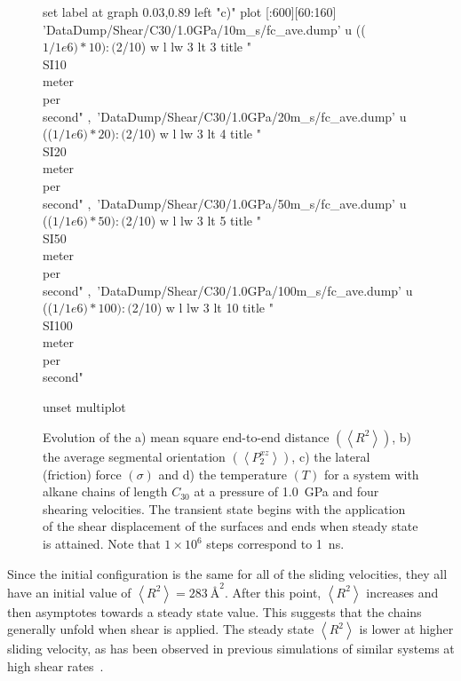 \documentclass[5p]{elsarticle}
\begin{document}
\begin{figure}[htp]
\begin{center}
\begin{gnuplot}[terminal=epslatex, terminaloptions={size \SERFigwidth cm, \SERFigheight cm color solid}]
			set label at graph 0.03,0.89 left "c)"
			plot  [:600][60:160]	'DataDump/Shear/C30/1.0GPa/10m_s/fc_ave.dump' u (($1/1e6)*10):($2/10) w l  lw 3    lt 3    title  "\\SI{10}{\\meter\\per\\second}"   ,\
							'DataDump/Shear/C30/1.0GPa/20m_s/fc_ave.dump' u (($1/1e6)*20):($2/10) w l  lw 3    lt 4    title  "\\SI{20}{\\meter\\per\\second}"   ,\
							'DataDump/Shear/C30/1.0GPa/50m_s/fc_ave.dump' u (($1/1e6)*50):($2/10) w l  lw 3     lt 5    title  "\\SI{50}{\\meter\\per\\second}"  ,\
							'DataDump/Shear/C30/1.0GPa/100m_s/fc_ave.dump' u (($1/1e6)*100):($2/10) w l  lw 3   lt 10    title  "\\SI{100}{\\meter\\per\\second}"  

			unset multiplot
		\end{gnuplot}

		\caption{Evolution of the a) mean square end-to-end distance $\left(\left< R^2 \right>\right)$, b) the average segmental orientation  $\left(\left<P_{2}^{xz}\right>\right)$, c) the lateral (friction) force  $\left(\sigma\right)$ and d) the temperature $\left(T\right)$ for a system with alkane chains of length $C_{30}$ at a pressure of \SI{1.0}{\giga\pascal} and four  shearing velocities. The transient state begins with the application of the shear displacement of the surfaces and ends when  steady state is attained. Note that $1 \times 10^{6}$ steps correspond to \SI{1}{\nano\second}.}
		\label{fig:SS}
	\end{center}
 \end{figure}

Since the initial configuration is the same for all of the sliding velocities, they all have an initial value of $\left< R^2 \right> = \SI{283}{\angstrom\squared}$. After this point, $\left< R^2 \right> $ increases and then asymptotes towards a steady state value. This suggests that the chains generally unfold when shear is applied. The steady state $\left< R^2 \right>$ is lower at higher sliding velocity, as has been observed in previous simulations of similar systems at high shear rates~\cite{Cho2017}.
\end{document}
